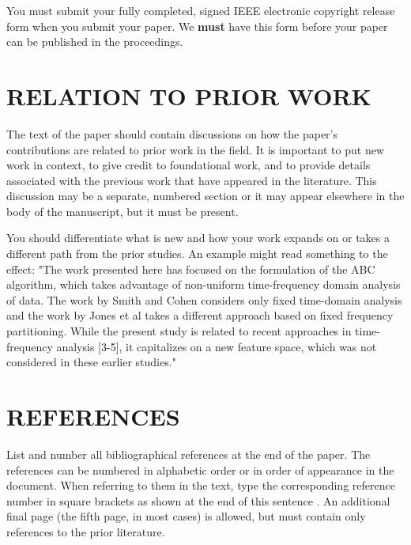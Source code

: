 \documentclass{article}
\begin{document}
You must submit your fully completed, signed IEEE electronic copyright release
form when you submit your paper. We {\bf must} have this form before your paper
can be published in the proceedings.

\section{RELATION TO PRIOR WORK}
\label{sec:prior}

The text of the paper should contain discussions on how the paper's
contributions are related to prior work in the field. It is important
to put new work in  context, to give credit to foundational work, and
to provide details associated with the previous work that have appeared
in the literature. This discussion may be a separate, numbered section
or it may appear elsewhere in the body of the manuscript, but it must
be present.

You should differentiate what is new and how your work expands on
or takes a different path from the prior studies. An example might
read something to the effect: "The work presented here has focused
on the formulation of the ABC algorithm, which takes advantage of
non-uniform time-frequency domain analysis of data. The work by
Smith and Cohen \cite{Lamp86} considers only fixed time-domain analysis and
the work by Jones et al \cite{C2} takes a different approach based on
fixed frequency partitioning. While the present study is related
to recent approaches in time-frequency analysis [3-5], it capitalizes
on a new feature space, which was not considered in these earlier
studies."

\vfill\pagebreak

\section{REFERENCES}
\label{sec:refs}

List and number all bibliographical references at the end of the
paper. The references can be numbered in alphabetic order or in
order of appearance in the document. When referring to them in
the text, type the corresponding reference number in square
brackets as shown at the end of this sentence \cite{C2}. An
additional final page (the fifth page, in most cases) is
allowed, but must contain only references to the prior
literature.



\end{document}
